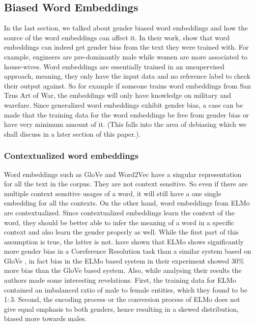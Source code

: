 \documentclass{article}
\begin{document}
\subsection*{Biased Word Embeddings}
In the last section, we talked about gender biased word embeddings and how the source of the word embeddings can affect it. In their work, \cite{bolukbasi2016man} show that word embeddings can indeed get gender bias from the text they were trained with. For example, engineers are pre-dominantly male while women are more associated to house-wives. Word embeddings are essentially trained in an unsupervised approach, meaning, they only have the input data and no reference label to check their output against. So for example if someone trains word embeddings from San Tzus Art of War, the embeddings will only have knowledge on military and warefare. Since generalized word embeddings exhibit gender bias, a case can be made that the training data for the word embeddings be free from gender bias or have very minimum amount of it. (This falls into the area of debiasing which we shall discuss in a later section of this paper.). 

\subsubsection*{Contextualized word embeddings}
Word embeddings such as GloVe \cite{pennington2014glove} and Word2Vec have a singular representation for all the text in the corpus. They are not context sensitive. So even if there are multiple context sensitive usages of a word, it will still have a one single embedding for all the contexts. On the other hand, word embeddings from ELMo \cite{peters2018deep} are contextualized. Since contextualized embeddings learn the context of the word, they should be better able to infer the meaning of a word in a specific context and also learn the gender properly as well. While the first part of this assumption is true, the latter is not. \cite{zhao2019gender} have shown that ELMo shows significantly more gender bias in a Coreference Resolution task than a similar system based on GloVe \cite{lee2018higher}, in fact bias in the ELMo based system in their experiment showed 30\% more bias than the GloVe based system. Also, while analysing their results the authors made some interesting revelations. First, the training data for ELMo contained an imbalanced ratio of male to female entities, which they found to be 1$:$3. Second, the encoding process or the conversion process of ELMo does not give equal emphasis to both genders, hence resulting in a skewed distribution, biased more towards males.  \\
\end{document}
